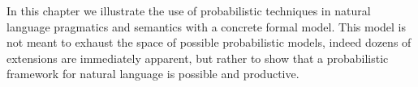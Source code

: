 \documentclass[12pt]{article}
\begin{document}
%


In this chapter we illustrate the use of probabilistic techniques in natural language pragmatics and semantics with a concrete formal model. This model is not meant to exhaust the space of possible probabilistic models, indeed dozens of extensions are immediately apparent, but rather to show that a probabilistic framework for natural language is possible and productive.
\end{document}
